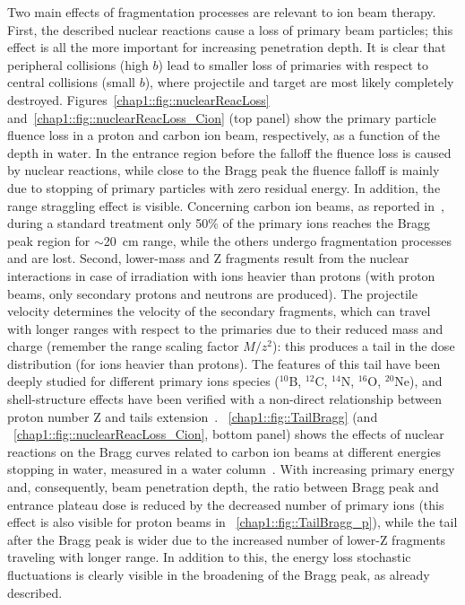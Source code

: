 Two main effects of fragmentation processes are relevant to ion beam therapy. 
First, the described nuclear reactions cause a loss of primary beam particles; this effect is all the more important for increasing penetration depth. It is clear that peripheral collisions (high $b$) lead to smaller loss of primaries with respect to central collisions (small $b$), where projectile and target are most likely completely destroyed. Figures~\ref{chap1::fig::nuclearReacLoss} and~\ref{chap1::fig::nuclearReacLoss_Cion} (top panel) show the primary particle fluence loss in a proton  and carbon ion beam, respectively, as a function of the depth in water. In the entrance region before the falloff the fluence loss is caused by nuclear reactions, while close to the Bragg peak the fluence falloff is mainly due to stopping of primary particles with zero residual energy. In addition, the range straggling effect is visible. Concerning carbon ion beams, as reported in~\cite{Durante2016}, during a standard treatment only 50\% of the primary ions reaches the Bragg peak region for $\sim$20~cm range, while the others undergo fragmentation processes and are lost.
Second, lower-mass and Z fragments result from the nuclear interactions in case of irradiation with ions heavier than protons (with proton beams, only secondary protons and neutrons are produced).
The projectile velocity determines the velocity of the secondary fragments, which can travel with longer ranges with respect to the primaries due to their reduced mass and charge (remember the range scaling factor $M/z^{2}$): this produces a tail in the dose distribution (for ions heavier than protons). The features of this tail have been deeply studied for different primary ions species ($^{10}$B, $^{12}$C, $^{14}$N, $^{16}$O, $^{20}$Ne), and shell-structure effects have been verified with a non-direct relationship between proton number Z and tails extension~\parencite{Schall1996}.  \figurename~\ref{chap1::fig::TailBragg} (and \figurename~\ref{chap1::fig::nuclearReacLoss_Cion}, bottom panel) shows the effects of nuclear reactions on the Bragg curves related to carbon ion beams at different energies stopping in water, measured in a water column~\parencite{Schardt2008}. With increasing primary energy and, consequently, beam penetration depth, the ratio between Bragg peak and entrance plateau dose is reduced by the decreased number of primary ions (this effect is also visible for proton beams in \figurename~\ref{chap1::fig::TailBragg_p}), while the tail after the Bragg peak is wider due to the increased number of lower-Z fragments traveling with longer range. In addition to this, the energy loss stochastic fluctuations is clearly visible in the broadening of the Bragg peak, as already described.  

